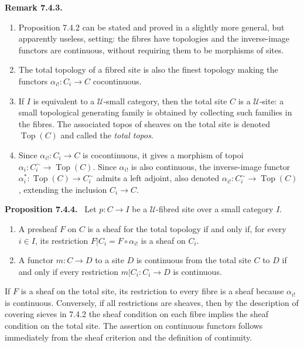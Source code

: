 \documentclass[11pt]{article}
\newcommand{\U}{\mathcal{U}}
\newcommand{\Top}{\operatorname{Top}}
\newenvironment{statement}[1]{\par\medskip\noindent\textbf{#1.}\ }{\par\medskip}
\newenvironment{remarktext}[1]{\par\medskip\noindent\textbf{#1.}\ }{\par\medskip}
\begin{document}
\begin{remarktext}{Remark 7.4.3}
\begin{enumerate}[label=\arabic*)]
\item Proposition 7.4.2 can be stated and proved in a slightly more general, but apparently useless, setting: the fibres have topologies and the inverse-image functors are continuous, without requiring them to be morphisms of sites.
\item The total topology of a fibred site is also the finest topology making the functors \(\alpha_{i!}:C_i\to C\) cocontinuous.
\item If \(I\) is equivalent to a \(\U\)-small category, then the total site \(C\) is a \(\U\)-site: a small topological generating family is obtained by collecting such families in the fibres. The associated topos of sheaves on the total site is denoted \(\Top(C)\) and called the \emph{total topos}.
\item Since \(\alpha_{i!}:C_i\to C\) is cocontinuous, it gives a morphism of topoi \(\alpha_i:C_i^{\sim}\to\Top(C)\). Since \(\alpha_{i!}\) is also continuous, the inverse-image functor \(\alpha_i^*:\Top(C)\to C_i^{\sim}\) admits a left adjoint, also denoted \(\alpha_{i!}:C_i^{\sim}\to\Top(C)\), extending the inclusion \(C_i\to C\).
\end{enumerate}
\end{remarktext}

\begin{statement}{Proposition 7.4.4}
Let \(p:C\to I\) be a \(\U\)-fibred site over a small category \(I\).
\begin{enumerate}[label=\arabic*)]
\item A presheaf \(F\) on \(C\) is a sheaf for the total topology if and only if, for every \(i\in I\), its restriction \(F|C_i=F\circ\alpha_{i!}\) is a sheaf on \(C_i\).
\item A functor \(m:C\to D\) to a site \(D\) is continuous from the total site \(C\) to \(D\) if and only if every restriction \(m|C_i:C_i\to D\) is continuous.
\end{enumerate}
\end{statement}

If \(F\) is a sheaf on the total site, its restriction to every fibre is a sheaf because \(\alpha_{i!}\) is continuous. Conversely, if all restrictions are sheaves, then by the description of covering sieves in 7.4.2 the sheaf condition on each fibre implies the sheaf condition on the total site. The assertion on continuous functors follows immediately from the sheaf criterion and the definition of continuity.
\end{document}
